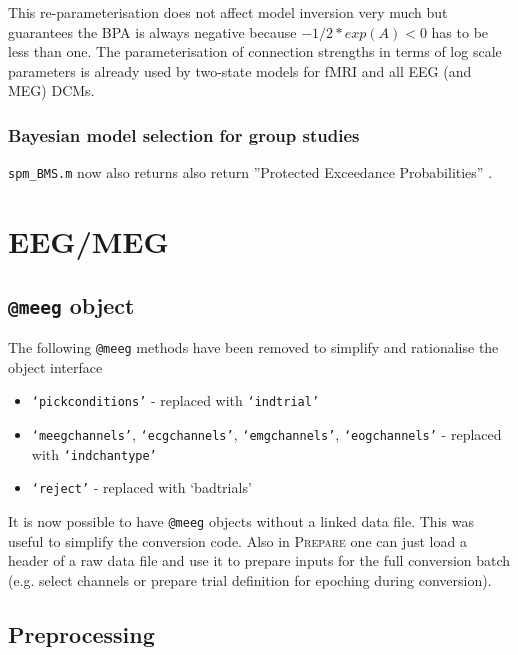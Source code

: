 \documentclass[a4paper,titlepage,openany]{article}
\begin{document}
\begin{multicols}{2}
This re-parameterisation does not affect model inversion very much but guarantees the BPA is always negative because $-1/2*exp(A) < 0$ has to be less than one. The parameterisation of connection strengths in terms of log scale parameters is already used by two-state models for fMRI and all EEG (and MEG) DCMs.

\subsubsection{Bayesian model selection for group studies}

\texttt{spm\_BMS.m} now also returns also return ''Protected Exceedance Probabilities'' \cite{Rigoux2014}.

\section{EEG/MEG}

\subsection{\texttt{@meeg} object}

The following \texttt{@meeg} methods have been removed to simplify and rationalise the object interface
\begin{itemize}
\item \texttt{`pickconditions'} - replaced with \texttt{`indtrial'}
\item \texttt{`meegchannels'}, \texttt{`ecgchannels'}, \texttt{`emgchannels'},  \texttt{`eogchannels'} - replaced with \texttt{`indchantype'}
\item \texttt{`reject'} - replaced with {`badtrials'}
\end{itemize}

It is now possible to have \texttt{@meeg} objects without a linked data file. This was useful to simplify the conversion code. Also in \textsc{Prepare} one can just load a header of a raw data file and use it to prepare inputs for the full conversion batch (e.g. select channels or prepare trial definition for epoching during conversion).


\subsection{Preprocessing}


\end{multicols}
\end{document}
